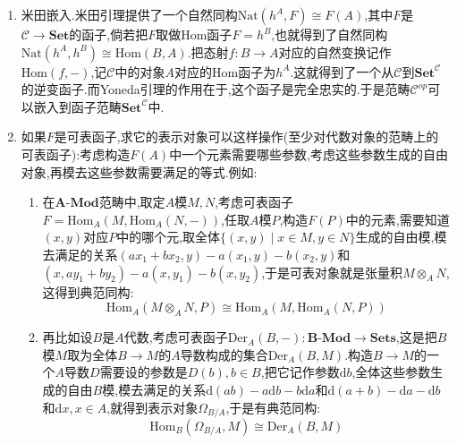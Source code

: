 \begin{enumerate}
\begin{proof}
		于是从$\eta_{A'}$是双射得到存在$f:A\to A'$满足$\eta_{A'}(f)=1_{A'}$,于是按照图表交换性得到$\eta_{A}(\varphi\circ f)=\varphi=\eta_A(1_A)$,于是按照$\eta_A$是同构就得到$\varphi\circ f=1_A$.
		
		最后只要证明$f\circ\varphi=1_{A'}$,为此,考虑态射$f:A\to A'$诱导的如下交换图,根据$f_*\circ\eta_A(1_A)=\eta_{A'}\circ f_*$就得到$f\circ\varphi=1_{A'}$.
		$$\xymatrix{\mathrm{Hom}_{\mathscr{C}}(A,A)\ar[d]_{f_*}\ar[rrr]^{\eta_{A}}&&&\mathrm{Hom}_{\mathscr{C}}(A',A)\ar[d]^{f_*}\\\mathrm{Hom}_{\mathscr{C}}(A,A')\ar[rrr]_{\eta_{A'}}&&&\mathrm{Hom}_{\mathscr{C}}(A',A')}$$
	\end{proof}
	\item 米田嵌入.米田引理提供了一个自然同构$\mathrm{Nat}(h^A,F)\cong F(A)$,其中$F$是$\mathscr{C}\to\textbf{Set}$的函子,倘若把$F$取做Hom函子$F=h^B$,也就得到了自然同构$\mathrm{Nat}(h^A,h^B)\cong\mathrm{Hom}(B,A)$.把态射$f:B\to A$对应的自然变换记作$\mathrm{Hom}(f,-)$,记$\mathscr{C}$中的对象$A$对应的Hom函子为$h^A$.这就得到了一个从$\mathscr{C}$到$\textbf{Set}^{\mathscr{C}}$的逆变函子.而Yoneda引理的作用在于,这个函子是完全忠实的.于是范畴$\mathscr{C}^{op}$可以嵌入到函子范畴$\textbf{Set}^{\mathscr{C}}$中.
	\item 如果$F$是可表函子,求它的表示对象可以这样操作(至少对代数对象的范畴上的可表函子):考虑构造$F(A)$中一个元素需要哪些参数,考虑这些参数生成的自由对象,再模去这些参数需要满足的等式.例如:
	\begin{enumerate}
		\item 在$\textbf{A-Mod}$范畴中,取定$A$模$M,N$,考虑可表函子$F=\mathrm{Hom}_A(M,\mathrm{Hom}_A(N,-))$,任取$A$模$P$,构造$F(P)$中的元素,需要知道$(x,y)$对应$P$中的哪个元,取全体$\{(x,y)\mid x\in M,y\in N\}$生成的自由模,模去满足的关系$(ax_1+bx_2,y)-a(x_1,y)-b(x_2,y)$和$(x,ay_1+by_2)-a(x,y_1)-b(x,y_2)$,于是可表对象就是张量积$M\otimes_AN$,这得到典范同构:
		$$\mathrm{Hom}_A(M\otimes_AN,P)\cong\mathrm{Hom}_A(M,\mathrm{Hom}_A(N,P))$$
		\item 再比如设$B$是$A$代数,考虑可表函子$\mathrm{Der}_A(B,-):\textbf{B-Mod}\to\textbf{Sets}$,这是把$B$模$M$取为全体$B\to M$的$A$导数构成的集合$\mathrm{Der}_A(B,M)$.构造$B\to M$的一个$A$导数$D$需要设的参数是$D(b),b\in B$,把它记作参数$\mathrm{d}b$,全体这些参数生成的自由$B$模,模去满足的关系$\mathrm{d}(ab)-a\mathrm{d}b-b\mathrm{d}a$和$\mathrm{d}(a+b)-\mathrm{d}a-\mathrm{d}b$和$\mathrm{d}x,x\in A$,就得到表示对象$\Omega_{B/A}$,于是有典范同构:
		$$\mathrm{Hom}_B(\Omega_{B/A},M)\cong\mathrm{Der}_A(B,M)$$
	\end{enumerate}
\end{enumerate}
\newpage
